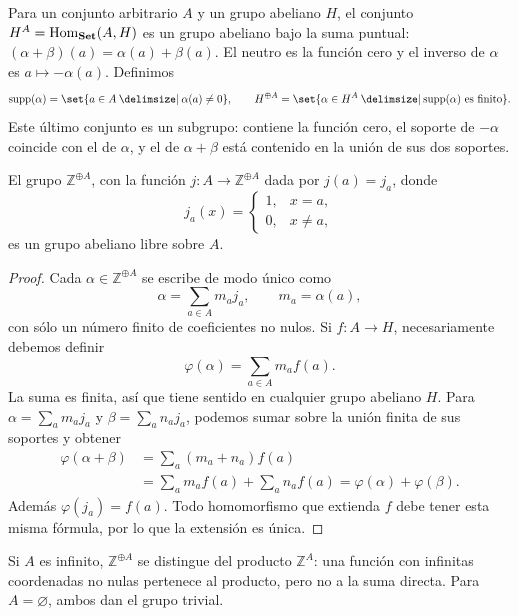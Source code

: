 Para un conjunto arbitrario $A$ y un grupo abeliano $H$, el conjunto $H^A=\operatorname{Hom}_{\mathbf{Set}}(A,H)$ es un grupo abeliano bajo la suma puntual: $(\alpha+\beta)(a)=\alpha(a)+\beta(a)$. El neutro es la función cero y el inverso de $\alpha$ es $a\mapsto-\alpha(a)$. Definimos
\[
\supp(\alpha)=\set{a\in A\given\alpha(a)\ne0},\qquad
H^{\oplus A}=\set{\alpha\in H^A\given\supp(\alpha)\text{ es finito}}.
\]
Este último conjunto es un subgrupo: contiene la función cero, el soporte de $-\alpha$ coincide con el de $\alpha$, y el de $\alpha+\beta$ está contenido en la unión de sus dos soportes.

\begin{prop}\label{prop:C4-libre-abeliano}
El grupo $\mathbb Z^{\oplus A}$, con la función $j:A\to\mathbb Z^{\oplus A}$ dada por $j(a)=j_a$, donde
\[
j_a(x)=\begin{cases}1,&x=a,\\0,&x\ne a,\end{cases}
\]
es un grupo abeliano libre sobre $A$.
\end{prop}
\begin{proof}
Cada $\alpha\in\mathbb Z^{\oplus A}$ se escribe de modo único como
\[
\alpha=\sum_{a\in A}m_a j_a,\qquad m_a=\alpha(a),
\]
con sólo un número finito de coeficientes no nulos. Si $f:A\to H$, necesariamente debemos definir
\[
\varphi(\alpha)=\sum_{a\in A}m_a f(a).
\]
La suma es finita, así que tiene sentido en cualquier grupo abeliano $H$. Para $\alpha=\sum_a m_a j_a$ y $\beta=\sum_a n_a j_a$, podemos sumar sobre la unión finita de sus soportes y obtener
\begin{align*}
\varphi(\alpha+\beta)
&=\sum_a(m_a+n_a)f(a)\\
&=\sum_a m_a f(a)+\sum_a n_a f(a)
=\varphi(\alpha)+\varphi(\beta).
\end{align*}
Además $\varphi(j_a)=f(a)$. Todo homomorfismo que extienda $f$ debe tener esta misma fórmula, por lo que la extensión es única.
\end{proof}
Si $A$ es infinito, $\mathbb Z^{\oplus A}$ se distingue del producto $\mathbb Z^A$: una función con infinitas coordenadas no nulas pertenece al producto, pero no a la suma directa. Para $A=\varnothing$, ambos dan el grupo trivial.
